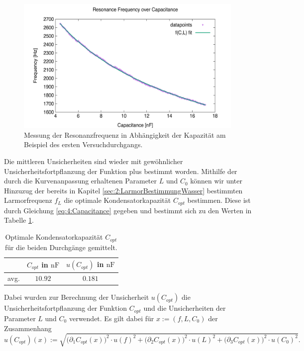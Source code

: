 \documentclass{article}
\begin{document}
        \begin{figure}[H]
            \centering
            \includegraphics[width=11cm]{../Bilddateien/Messung1_Resonance_Freq_vs_Capacitance.png}
            \caption{Messung der Resonanzfrequenz in Abhängigkeit der Kapazität am Beispiel des ersten Versuchdurchgangs.}
            \label{fig:4:LCRResonance}
        \end{figure}
        Die mittleren Unsicherheiten sind wieder mit gewöhnlicher Unsicherheitsfortpflanzung der Funktion plus bestimmt worden. Mithilfe der durch die Kurvenanpassung erhaltenen Parameter $L$ und $C_0$ können wir unter Hinzuzug der bereits in Kapitel \ref{sec:2:LarmorBestimmungWasser} bestimmten Larmorfrequenz $f_L$ die optimale Kondensatorkapazität $C_{opt}$ bestimmen. Diese ist durch Gleichung \eqref{eq:4:Capacitance} gegeben und bestimmt sich zu den Werten in Tabelle \ref{tab:4:OptimalCapacitance}.
        \begin{table}[H]
            \centering
            \begin{tabular}{c|cc}
                \hline
                 & $C_{opt}$ in $\si{\nano\farad}$ & $u(C_{opt})$ in $\si{\nano\farad}$ \\
                \hline\hline
                avg. & $10.92$ & $0.181$\\
                \hline
            \end{tabular}
            \caption{Optimale Kondensatorkapazität $C_{opt}$ für die beiden Durchgänge gemittelt.}
            \label{tab:4:OptimalCapacitance}
        \end{table}
        Dabei wurden zur Berechnung der Unsicherheit $u(C_{opt})$ die Unsicherheitsfortpflanzung der Funktion $C_{opt}$ und die Unsicherheiten der Parameter $L$ und $C_0$ verwendet. Es gilt dabei für $x:=(f,L,C_0)$ der Zusammenhang
        \[
            u(C_{opt})(x) := \sqrt{\bigl(\partial_1C_{opt}(x)\bigr)^2\cdot u(f)^2 + \bigl(\partial_2C_{opt}(x)\bigr)^2\cdot u(L)^2 + \bigl(\partial_3C_{opt}(x)\bigr)^2\cdot u(C_0)^2}.
        \]
        



    
\end{document}
